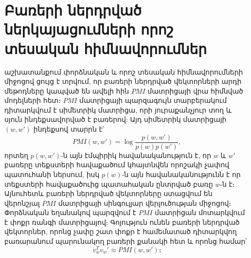 \documentclass[11pt]{article}
\begin{document}
\pagebreak

\section*{\hfill Բառերի ներդրված ներկայացումների որոշ տեսական հիմնավորումներ \hfill} \noindent

{}

\par \cite{bib_item_24} աշխատանքում փորձնական և որոշ տեսական հիմնավորումների միջոցով ցույց է տրվում, որ բառերի ներդրված  վեկտորների արդի մեթոդները կապված են ավելի հին $PMI$ մատրիցայի վրա հիմնված մոդելների հետ։ $PMI$ մատրիցայի պարզագույն տարբերակում   դիտարկվում է սիմետրիկ մատրիցա, որի յուրաքանչյուր տող և սյուն ինդեքսավորված է բառերով:  Այդ սիմետրիկ մատրիցայի $(w, w')$ ինդեքսով տարրն է՝ 
\begin{equation}
PMI(w, w') = \log \frac{p(w, w')}{p(w)p(w')},
\end{equation} որտեղ $p(w, w')$-ն այն էմպիրիկ հավանականություն է, որ $w$ և $w'$  բառերը տեքստերի հավաքածում կհայտնվեն որոշակի չափով պատուհանի ներսում, իսկ $p(w)$-ն  այն հավանականությունն է որ տեքստերի հավաքածուից պատահական ընտրված բառը $w$-ն է։ Այնուհետև բառերի ներդրված վեկտորները ստացվում են վերոնշյալ $PMI$ մատրիցայի սինգուլյար վերլուծության միջոցով։ Փորձնական եղանակով պարզվում է $PMI$ մատրիցան մոտարկվում է փոքր ռանգի մատրիցայով: Գոյություն ունեն բառերի ներդրված  վեկտորներ, որոնց չափը շատ փոքր է համեմատած դիտարկվող բառարանում պարունակող բառերի քանակի հետ և որոնց համար՝ 
\begin{equation}
v_w^Tv_w' \approx PMI(w, w')։
\label{pmi_approx}
\end{equation}
\end{document}
